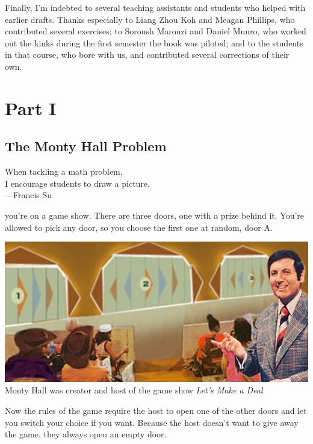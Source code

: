 \documentclass[justified]{tufte-book}
\newenvironment{epigraph}%
{
\begin{flushright}    
\begin{minipage}{20em}
\begin{flushright}
\itshape
}%
{
\end{flushright}
\end{minipage}
\end{flushright}
}
\begin{document}
Finally, I'm indebted to several teaching assistants and students who helped with earlier drafts. Thanks especially to Liang Zhou Koh and Meagan Phillips, who contributed several exercises; to Soroush Marouzi and Daniel Munro, who worked out the kinks during the first semester the book was piloted; and to the students in that course, who bore with us, and contributed several corrections of their own.

\hypertarget{part-part-i}{%
\part*{Part I}\label{part-part-i}}

\hypertarget{the-monty-hall-problem}{%
\chapter{The Monty Hall Problem}\label{the-monty-hall-problem}}

\begin{epigraph}
When tackling a math problem,\\
I encourage students to draw a picture.\\
---Francis Su
\end{epigraph}

 you're on a game show. There are three doors, one with a prize behind it. You're allowed to pick any door, so you choose the first one at random, door A.

\begin{marginfigure}
\includegraphics{img/lets_make_a_deal.png} Monty Hall was creator and
host of the game show \emph{Let's Make a Deal}.
\end{marginfigure}

Now the rules of the game require the host to open one of the other doors and let you switch your choice if you want. Because the host doesn't want to give away the game, they always open an empty door.
\end{document}
